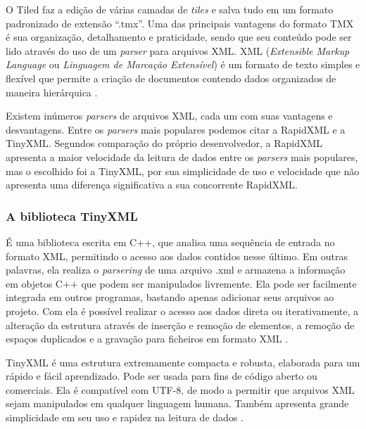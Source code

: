 %
\par
%
%
O Tiled faz a edição de várias camadas de \textit{tiles} e salva tudo em um formato padronizado de extensão ``.tmx''. Uma das principais vantagens do formato TMX é sua organização, detalhamento e praticidade, sendo que seu conteúdo pode ser lido através do uso de um \textit{parser} para arquivos XML. XML (\textit{Extensible Markup Language} ou \textit{Linguagem de Marcação Extensível}) é um formato de texto simples e flexível que permite a criação de documentos contendo dados organizados de maneira hierárquica \cite{XMLDOC}.  
\par 
Existem inúmeros \textit{parsers} de arquivos XML, cada um com suas vantagens e desvantagens. Entre os \textit{parsers} mais populares podemos citar a RapidXML e a TinyXML. Segundos comparação do próprio desenvolvedor, a RapidXML apresenta a maior velocidade da leitura de dados entre os \textit{parsers} mais populares, mas o escolhido foi a TinyXML, por sua simplicidade de uso e velocidade que não apresenta uma diferença significativa a sua concorrente RapidXML. 
%
%
\subsubsection{A biblioteca TinyXML}
\label{tinyXML}
%
É uma biblioteca escrita em C++, que analisa uma sequência de entrada no formato XML, permitindo o acesso aos dados contidos nesse último. Em outras palavras, ela realiza o \textit{parsering} de uma arquivo .xml e armazena a informação em objetos C++ que podem ser manipulados livremente. Ela pode ser facilmente integrada em outros programas, bastando apenas adicionar seus arquivos ao projeto. Com ela é possível realizar o acesso aos dados direta ou iterativamente, a alteração da estrutura através de inserção e remoção de elementos, a remoção de espaços duplicados e a gravação para ficheiros em formato XML \cite{TinyXMLTutorial}.
\par
TinyXML é uma estrutura extremamente compacta e robusta, elaborada para um rápido e fácil aprendizado. Pode ser usada para fins de código aberto ou comerciais. Ela é compatível com UTF-8, de modo a permitir que arquivos XML sejam manipulados em qualquer linguagem humana. Também apresenta grande simplicidade em seu uso e rapidez na leitura de dados \cite{TinyXMLTutorial}.
%
%
